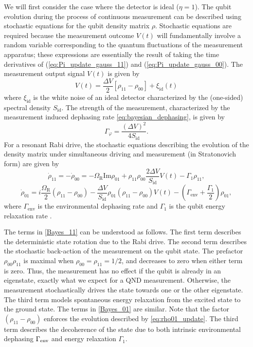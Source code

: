 We will first consider the case where the detector is ideal ($\eta=1$). The qubit evolution during the process of continuous measurement can be described using stochastic equations \cite{Korotkov2001} for the qubit density matrix $\rho$. Stochastic equations are required because the measurement outcome $V(t)$ will fundamentally involve a random variable corresponding to the quantum fluctuations of the measurement apparatus; these expressions are essentially the result of taking the time derivatives of (\ref{eq:Pi_update_gauss_11}) and (\ref{eq:Pi_update_gauss_00}).   The measurement output signal $V(t)$ is given by
\begin{equation}
V(t) = \frac{\Delta V}{2} [\rho_{11}-\rho_{00}] + \xi_{\mathrm{id}}(t)
\label{meas_I}
\end{equation}
where $\xi_{\mathrm{id}}$ is the white noise of an ideal detector characterized by the (one-sided) spectral density $S_{\mathrm{id}}$.  The strength of the measurement, characterized by the measurement induced dephasing rate \eqref{eq:bayesian_dephasing}, is given by
\begin{equation}
\Gamma_{\varphi}=\frac{(\Delta V)^{2}}{4S_{\mathrm{id}}}.
\end{equation}
For a resonant Rabi drive, the stochastic equations describing the evolution of the density matrix under simultaneous driving and measurement (in Stratonovich form) are given by
\begin{equation}
 \dot{\rho}_{11}=-\dot{\rho}_{00}=-\Omega _{\mathrm{R}}\mathrm{Im}\rho_{01}+\rho _{11}\rho _{00}\frac{2\Delta V}{S_{\mathrm{id}}}V(t)-\Gamma_{1} \rho_{11},  \label{Bayes_11}
\end{equation}
\begin{equation}
\dot{\rho}_{01} =i\frac{\Omega _{\mathrm{R}}}{2}\left( \rho _{11}-\rho_{00}\right) -\frac{\Delta V}{S_{\mathrm{id}}}\rho _{01}\left( \rho _{11}-\rho_{00}\right) V(t) -(\Gamma _{\mathrm{env}} + \frac{\Gamma_{1}}{2})\rho _{01},  \label{Bayes_01}
\end{equation}
where $\Gamma _{\mathrm{env}}$ is the environmental dephasing rate and $\Gamma_{1}$ is the qubit energy relaxation rate \cite{korotkov_dir_fb}.

The terms in \eqref{Bayes_11} can be understood as follows.  The first term describes the deterministic state rotation due to the Rabi drive.  The second term describes the stochastic back-action of the measurement on the qubit state.  The prefactor $\rho_{00}\rho_{11}$ is maximal when $\rho_{00} = \rho_{11} = 1/2$, and decreases to zero when either term is zero.  Thus, the measurement has no effect if the qubit is already in an eigenstate, exactly what we expect for a QND measurement.  Otherwise, the measurement stochastically drives the state towards one or the other eigenstate.  The third term models spontaneous energy relaxation from the excited state to the ground state.  The terms in \eqref{Bayes_01} are similar.  Note that the factor $( \rho _{11}-\rho_{00})$ enforces the evolution described by \eqref{eq:rho01_update}.  The third term describes the decoherence of the state due to both intrinsic environmental dephasing $\Gamma_{\rm env}$ and energy relaxation $\Gamma_1$.


